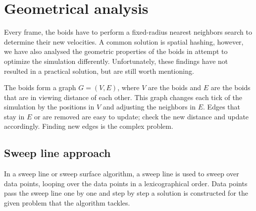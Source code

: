 \section{Geometrical analysis}
Every frame, the boids have to perform a fixed-radius nearest neighbors search to determine their 
new velocities. A common solution is spatial hashing, however, we have also analysed the geometric 
properties of the boids in attempt to optimize the simulation differently. Unfortunately, these 
findings have not resulted in a practical solution, but are still worth mentioning.

The boids form a graph $G = (V, E)$, where $V$ are the boids and $E$ are the boids that are in 
viewing distance of each other. This graph changes each tick of the simulation by the positions 
in $V$ and adjusting the neighbors in $E$. Edges that stay in $E$ or are removed are easy to update; 
check the new distance and update accordingly. Finding new edges is the complex problem.

\subsection{Sweep line approach}
In a sweep line or sweep surface algorithm, a sweep line is used to sweep over data points, looping over
the data points in a lexicographical order. Data points pass the sweep line one by one and step by step
a solution is constructed for the given problem that the algorithm tackles.